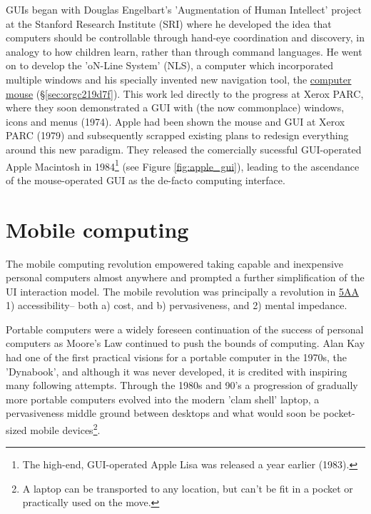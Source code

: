 \documentclass[logo,bsc,singlespacing,parskip]{infthesis}
\begin{document}
GUIs began with Douglas Engelbart's 'Augmentation of Human Intellect' project at the Stanford Research Institute (SRI) where he developed the idea that computers should be controllable through hand-eye coordination and discovery, in analogy to how children learn, rather than through command languages.
He went on to develop the 'oN-Line System' (NLS), a computer which incorporated multiple windows and his specially invented new navigation tool, the \hyperref[sec:orgc219d7f]{computer mouse} (\S \ref{sec:orgc219d7f}).
This work led directly to the progress at Xerox PARC, where they soon demonstrated a GUI with (the now commonplace) windows, icons and menus (1974).
Apple had been shown the mouse and GUI at Xerox PARC (1979) and subsequently scrapped existing plans to redesign everything around this new paradigm.
They released the comercially sucessful GUI-operated Apple Macintosh in 1984\footnote{The high-end, GUI-operated Apple Lisa was released a year earlier (1983).} (see Figure \ref{fig:apple_gui}),  leading to the ascendance of the mouse-operated GUI as the de-facto computing interface.

\section{Mobile computing}
\label{sec:orgd1670bd}
The mobile computing revolution empowered taking capable and inexpensive personal computers almost anywhere and prompted a further simplification of the UI interaction model.
The mobile revolution was principally a revolution in \hyperref[org85f90e8]{5AA} 1) accessibility-- both a) cost, and b) pervasiveness, and 2) mental impedance.

Portable computers were a widely foreseen continuation of the success of personal computers as Moore's Law continued to push the bounds of computing.
Alan Kay had one of the first practical visions for a portable computer in the 1970s, the 'Dynabook', and although it was never developed, it is credited with inspiring many following attempts.
Through the 1980s and 90's a progression of gradually more portable computers evolved into the modern 'clam shell' laptop, a pervasiveness middle ground between desktops and what would soon be pocket-sized mobile devices\footnote{A laptop can be transported to any location, but can't be fit in a pocket or practically used on the move.}.
\end{document}
